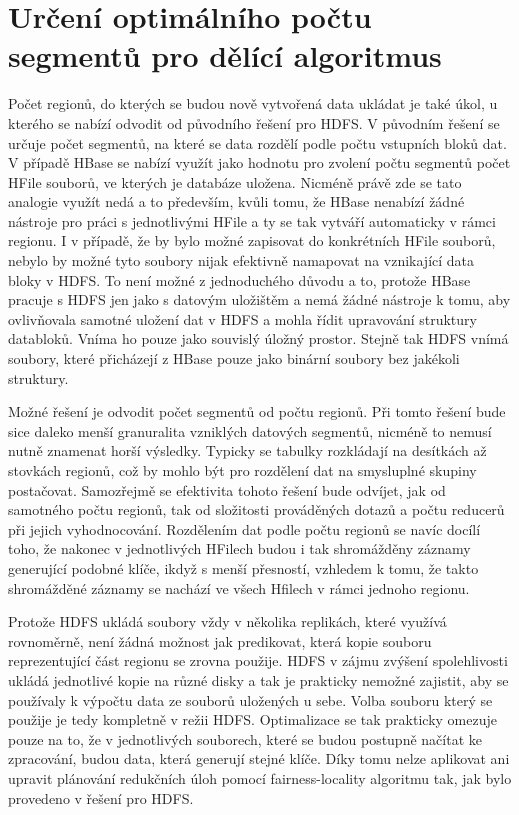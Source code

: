 \documentclass[thesis=M,czech]{FITthesis}[2012/06/26]
\begin{document}
\section{Určení optimálního počtu segmentů pro dělící algoritmus}
Počet regionů, do kterých se budou nově vytvořená data ukládat je také úkol, u kterého se nabízí odvodit od původního řešení pro HDFS. V původním řešení se určuje počet segmentů, na které se data rozdělí podle počtu vstupních bloků dat. V případě HBase se nabízí využít jako hodnotu pro zvolení počtu segmentů počet HFile souborů, ve kterých je databáze uložena. Nicméně právě zde se tato analogie využít nedá a to především, kvůli tomu, že HBase nenabízí žádné nástroje pro práci s jednotlivými HFile a ty se tak vytváří automaticky v rámci regionu. I v případě, že by bylo možné zapisovat do konkrétních HFile souborů, nebylo by možné tyto soubory nijak efektivně namapovat na vznikající data bloky v HDFS. To není možné z jednoduchého důvodu a to, protože HBase pracuje s HDFS jen jako s datovým uložištěm a nemá žádné nástroje k tomu, aby ovlivňovala samotné uložení dat v HDFS a mohla řídit upravování struktury databloků. Vníma ho pouze jako souvislý úložný prostor. Stejně tak HDFS vnímá soubory, které přicházejí z HBase pouze jako binární soubory bez jakékoli struktury.

Možné řešení je odvodit počet segmentů od počtu regionů. Při tomto řešení bude sice daleko menší granuralita vzniklých datových segmentů, nicméně to nemusí nutně znamenat horší výsledky. Typicky se tabulky rozkládají na desítkách až stovkách regionů, což by mohlo být pro rozdělení dat na smysluplné skupiny postačovat. Samozřejmě se efektivita tohoto řešení bude odvíjet, jak od samotného počtu regionů, tak od složitosti prováděných dotazů a počtu reducerů při jejich vyhodnocování. Rozdělením dat podle počtu regionů se navíc docílí toho, že nakonec v jednotlivých HFilech budou i tak shromážděny záznamy generující podobné klíče, ikdyž s menší přesností, vzhledem k tomu, že takto shromážděné záznamy se nachází ve všech Hfilech v rámci jednoho regionu.

Protože HDFS ukládá soubory vždy v několika replikách, které využívá rovnoměrně, není žádná možnost jak predikovat, která kopie souboru reprezentující část regionu se zrovna použije. HDFS v zájmu zvýšení spolehlivosti ukládá jednotlivé kopie na různé disky a tak je prakticky nemožné zajistit, aby se používaly k výpočtu data ze souborů uložených u sebe. Volba souboru který se použije je tedy kompletně v režii HDFS. Optimalizace se tak prakticky omezuje pouze na to, že v jednotlivých souborech, které se budou postupně načítat ke zpracování, budou data, která generují stejné klíče. Díky tomu nelze aplikovat ani upravit plánování redukčních úloh pomocí fairness-locality algoritmu tak, jak bylo provedeno v řešení pro HDFS. 
\end{document}
